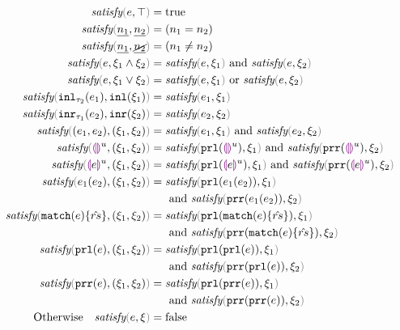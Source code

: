 \begin{subequations}\label{defn:satisfy}
\begin{align}
  \fsatisfy{e}{\ctruth} ={}& \true \label{defn:satisfy-truth}\\
  \fsatisfy{\hnum{n_1}}{\cnum{n_2}} ={}& (n_1 = n_2) \label{defn:num-satisfy-num}\\
  \fsatisfy{\hnum{n_1}}{\cnotnum{n_2}} ={}& (n_1 \neq n_2) \label{defn:num-satisfy-notnum}\\
  \fsatisfy{e}{\cand{\xi_1}{\xi_2}} ={}& \fsatisfy{e}{\xi_1} \text{ and } \fsatisfy{e}{\xi_2} \label{defn:satisfy-and}\\
  \fsatisfy{e}{\cor{\xi_1}{\xi_2}} ={}& \fsatisfy{e}{\xi_1} \text{ or } \fsatisfy{e}{\xi_2} \label{defn:satisfy-or}\\
  \fsatisfy{\hinl{\tau_2}{e_1}}{\cinl{\xi_1}} ={}& \fsatisfy{e_1}{\xi_1} \label{defn:inl-satisfy-inl}\\
  \fsatisfy{\hinr{\tau_1}{e_2}}{\cinr{\xi_2}} ={}& \fsatisfy{e_2}{\xi_2} \label{defn:inr-satisfy-inr}\\
  \fsatisfy{\hpair{e_1}{e_2}}{\cpair{\xi_1}{\xi_2}} ={}& \fsatisfy{e_1}{\xi_1} \text{ and } \fsatisfy{e_2}{\xi_2} \label{defn:pair-satisfy-pair}\\
  \fsatisfy{\hehole{u}}{\cpair{\xi_1}{\xi_2}} ={}& \fsatisfy{\hprl{\hehole{u}}}{\xi_1} \text{ and } \fsatisfy{\hprr{\hehole{u}}}{\xi_2}
  \label{defn:ehole-satisfy-pair} \\
  \fsatisfy{\hhole{e}{u}}{\cpair{\xi_1}{\xi_2}} ={}& \fsatisfy{\hprl{\hhole{e}{u}}}{\xi_1} \text{ and } \fsatisfy{\hprr{\hhole{e}{u}}}{\xi_2}
  \label{defn:hole-satisfy-pair} \\
  \fsatisfy{\hap{e_1}{e_2}}{\cpair{\xi_1}{\xi_2}} ={}& \fsatisfy{\hprl{\hap{e_1}{e_2}}}{\xi_1} \notag\\
  &\text{ and } \fsatisfy{\hprr{\hap{e_1}{e_2}}}{\xi_2}
  \label{defn:ap-satisfy-pair} \\
  \fsatisfy{\hmatch{e}{\zrules}}{\cpair{\xi_1}{\xi_2}} ={}& \fsatisfy{\hprl{\hmatch{e}{\zrules}}}{\xi_1} \notag\\
  &\text{ and } \fsatisfy{\hprr{\hmatch{e}{\zrules}}}{\xi_2}
  \label{defn:match-satisfy-pair} \\
  \fsatisfy{\hprl{e}}{\cpair{\xi_1}{\xi_2}} ={}& \fsatisfy{\hprl{\hprl{e}}}{\xi_1} \notag\\
  &\text{ and } \fsatisfy{\hprr{\hprl{e}}}{\xi_2}
  \label{defn:prl-satisfy-pair} \\
  \fsatisfy{\hprr{e}}{\cpair{\xi_1}{\xi_2}} ={}& \fsatisfy{\hprl{\hprr{e}}}{\xi_1} \notag\\
  &\text{ and } \fsatisfy{\hprr{\hprr{e}}}{\xi_2}
  \label{defn:prr-satisfy-pair} \\
  \text{Otherwise}\quad \fsatisfy{e}{\xi} ={}& \false \label{defn:not-satisfy}
\end{align}
\end{subequations}

